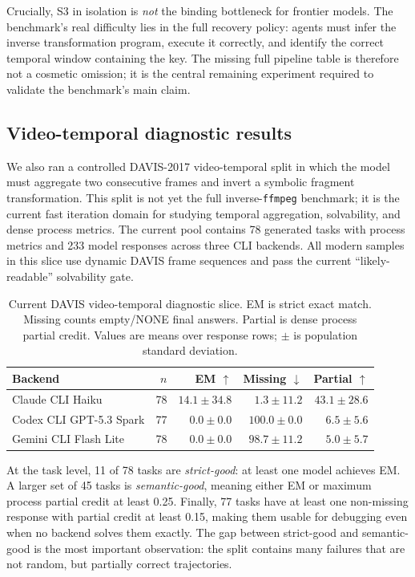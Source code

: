 Crucially, S3 in isolation is \emph{not} the binding bottleneck for frontier
models. The benchmark's real difficulty lies in the full recovery policy:
agents must infer the inverse transformation program, execute it correctly, and
identify the correct temporal window containing the key. The missing full
pipeline table is therefore not a cosmetic omission; it is the central
remaining experiment required to validate the benchmark's main claim.

\subsection{Video-temporal diagnostic results}

We also ran a controlled DAVIS-2017 video-temporal split in which the model
must aggregate two consecutive frames and invert a symbolic fragment
transformation. This split is not yet the full inverse-\texttt{ffmpeg}
benchmark; it is the current fast iteration domain for studying temporal
aggregation, solvability, and dense process metrics. The current pool contains
78 generated tasks with process metrics and 233 model responses across three
CLI backends. All modern samples in this slice use dynamic DAVIS frame
sequences and pass the current ``likely-readable'' solvability gate.

\begin{table}[h]
\centering\small
\caption{Current DAVIS video-temporal diagnostic slice. EM is strict exact
match. Missing counts empty/NONE final answers. Partial is dense process
partial credit. Values are means over response rows; $\pm$ is population
standard deviation.}
\label{tab:video-temporal-current}
\begin{tabular}{lrrrr}
\toprule
Backend & $n$ & EM $\uparrow$ & Missing $\downarrow$ & Partial $\uparrow$ \\
\midrule
Claude CLI Haiku & 78 & $14.1{\pm}34.8$ & $1.3{\pm}11.2$ & $43.1{\pm}28.6$ \\
Codex CLI GPT-5.3 Spark & 77 & $0.0{\pm}0.0$ & $100.0{\pm}0.0$ & $6.5{\pm}5.6$ \\
Gemini CLI Flash Lite & 78 & $0.0{\pm}0.0$ & $98.7{\pm}11.2$ & $5.0{\pm}5.7$ \\
\bottomrule
\end{tabular}
\end{table}

At the task level, 11 of 78 tasks are \emph{strict-good}: at least one model
achieves EM. A larger set of 45 tasks is \emph{semantic-good}, meaning either
EM or maximum process partial credit at least 0.25. Finally, 77 tasks have at
least one non-missing response with partial credit at least 0.15, making them
usable for debugging even when no backend solves them exactly. The gap between
strict-good and semantic-good is the most important observation: the split
contains many failures that are not random, but partially correct trajectories.

